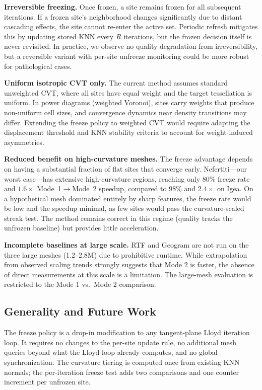 \textbf{Irreversible freezing.} Once frozen, a site remains frozen for all subsequent iterations. If a frozen site's neighborhood changes significantly due to distant cascading effects, the site cannot re-enter the active set. Periodic refresh mitigates this by updating stored KNN every $R$ iterations, but the frozen decision itself is never revisited. In practice, we observe no quality degradation from irreversibility, but a reversible variant with per-site unfreeze monitoring could be more robust for pathological cases.

\textbf{Uniform isotropic CVT only.} The current method assumes standard unweighted CVT, where all sites have equal weight and the target tessellation is uniform. In power diagrams (weighted Voronoi), sites carry weights that produce non-uniform cell sizes, and convergence dynamics near density transitions may differ. Extending the freeze policy to weighted CVT would require adapting the displacement threshold and KNN stability criteria to account for weight-induced asymmetries.

\textbf{Reduced benefit on high-curvature meshes.} The freeze advantage depends on having a substantial fraction of flat sites that converge early. Nefertiti---our worst case---has extensive high-curvature regions, reaching only 80\% freeze rate and $1.6\times$ Mode~1$\to$Mode~2 speedup, compared to 98\% and $2.4\times$ on Igea. On a hypothetical mesh dominated entirely by sharp features, the freeze rate would be low and the speedup minimal, as few sites would pass the curvature-scaled streak test. The method remains correct in this regime (quality tracks the unfrozen baseline) but provides little acceleration.

\textbf{Incomplete baselines at large scale.} RTF and Geogram are not run on the three large meshes (1.2--2.8M) due to prohibitive runtime. While extrapolation from observed scaling trends strongly suggests that Mode 2 is faster, the absence of direct measurements at this scale is a limitation. The large-mesh evaluation is restricted to the Mode 1 vs.\ Mode 2 comparison.

\subsection{Generality and Future Work}

The freeze policy is a drop-in modification to any tangent-plane Lloyd iteration loop. It requires no changes to the per-site update rule, no additional mesh queries beyond what the Lloyd loop already computes, and no global synchronization. The curvature tiering is computed once from existing KNN normals; the per-iteration freeze test adds two comparisons and one counter increment per unfrozen site.

